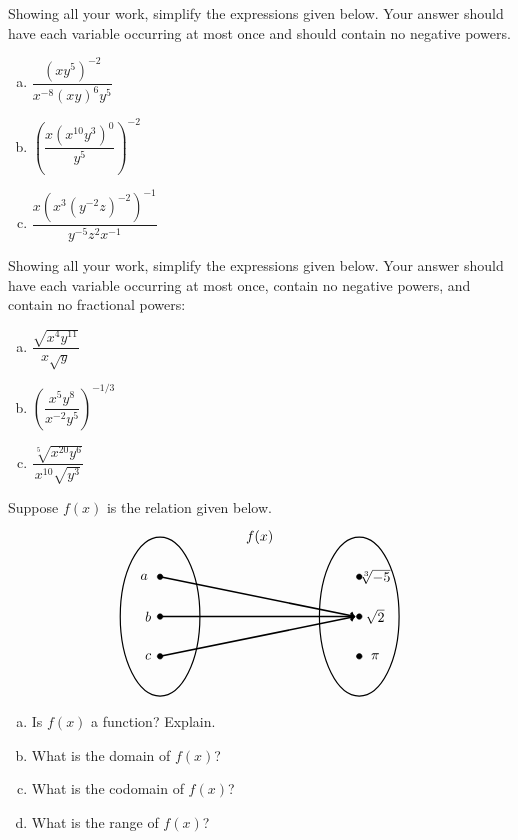\documentclass[11pt,letterpaper]{article}
\begin{document}
\prob Showing all your work, simplify the expressions given below. Your answer should have each variable occurring at most once and should contain no negative powers.
	\begin{enumerate}[(a)]
	\item $\dfrac{(x y^5)^{-2}}{x^{-8} (x y)^6 y^5}$
	\item $\left( \dfrac{x (x^{10} y^{3})^0}{y^5} \right)^{-2}$
	\item $\dfrac{x \left( x^3 (y^{-2} z)^{-2} \right)^{-1}}{y^{-5} z^{2} x^{-1}}$
	\end{enumerate} \pspace


\prob Showing all your work, simplify the expressions given below. Your answer should have each variable occurring at most once, contain no negative powers, and contain no fractional powers:
	\begin{enumerate}[(a)]
	\item $\dfrac{\sqrt{x^4 y^{11}}}{x \sqrt{y}}$
	\item $\left( \dfrac{x^5 y^8}{x^{-2} y^5} \right)^{-1/3}$
	\item $\dfrac{\sqrt[5]{x^{20} y^6}}{x^{10} \sqrt{y^3}}$
	\end{enumerate} \pspace


\prob Suppose $f(x)$ is the relation given below.
	\[
	\begin{tikzpicture}
	\node at (2.5,2) {$f(x)$};
	\draw[line width=0.03cm] (0,0) circle (1 and 2);
	\draw[line width=0.03cm] (5,0) circle (1 and 2);
	
	\draw[fill=black] (0,1) circle (0.07);
	\draw[fill=black] (0,0) circle (0.07);
	\draw[fill=black] (0,-1) circle (0.07);
	
	\draw[fill=black] (5,1) circle (0.07);
	\draw[fill=black] (5,0) circle (0.07);
	\draw[fill=black] (5,-1) circle (0.07);
	
	\draw[line width=0.04cm,->] (0,1) -- (4.9,0);
	\draw[line width=0.04cm,->] (0,0) -- (4.9,0);
	\draw[line width=0.04cm,->] (0,-1) -- (4.9,0);
	
	\node at (-0.4,1) {$a$};
	\node at (-0.3,0) {$b$};
	\node at (-0.3,-1) {$c$};
	
	\node at (5.4,1) {$\sqrt[3]{-5}$};
	\node at (5.4,0) {$\sqrt{2}$};
	\node at (5.4,-1) {$\pi$};
	\end{tikzpicture}
	\]

\begin{enumerate}[(a)]
\item Is $f(x)$ a function? Explain.
\item What is the domain of $f(x)$?
\item What is the codomain of $f(x)$?
\item What is the range of $f(x)$?
\end{enumerate} \pspace
\end{document}
